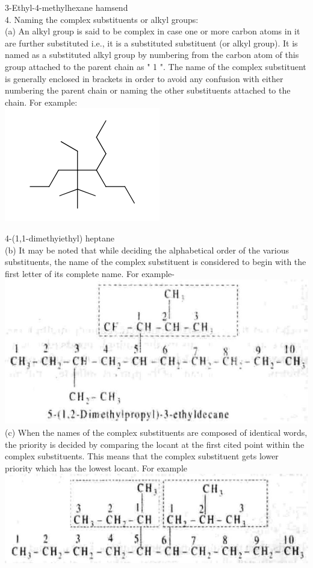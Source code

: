 \documentclass[10pt]{article}
\begin{document}
3-Ethyl-4-methylhexane hamsend\\
4. Naming the complex substituents or alkyl groups:\\
(a) An alkyl group is said to be complex in case one or more carbon atoms in it are further substituted i.e., it is a substituted substituent (or alkyl group). It is named as a substituted alkyl group by numbering from the carbon atom of this group attached to the parent chain as " 1 ". The name of the complex substituent is generally enclosed in brackets in order to avoid any confusion with either numbering the parent chain or naming the other substituents attached to the chain. For example:\\
\includegraphics{smile-ed1c8218c3461fd684b7c4b14cc1946c88bd727c}

4-(1,1-dimethyiethyl) heptane\\
(b) It may be noted that while deciding the alphabetical order of the various substituents, the name of the complex substituent is considered to begin with the first letter of its complete name. For example-\\
\includegraphics[max width=\textwidth, center]{2025_01_28_8470952b98110cec3aabg-021}\\
(c) When the names of the complex substituents are composed of identical words, the priority is decided by comparing the locant at the first cited point within the complex substituents. This means that the complex substituent gets lower priority which has the lowest locant. For example\\
\includegraphics[max width=\textwidth, center]{2025_01_28_8470952b98110cec3aabg-021(2)}
\end{document}
